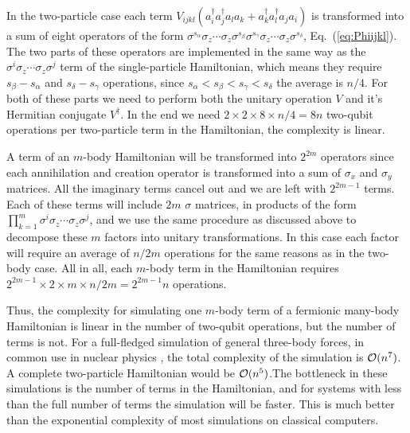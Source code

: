 In the two-particle case each term $V_{ijkl}(a^\dag_i a^\dag_j a_l a_k
+ a^\dag_k a^\dag_l a_j a_i)$ is transformed into a sum of eight
operators of the form $\sigma^{s_\alpha} \sigma_z \cdots \sigma_z
\sigma^{s_\beta} \sigma^{s_\gamma} \sigma_z \cdots \sigma_z
\sigma^{s_\delta}$, Eq.~(\ref{eq:Phiijkl}). The two parts of these
operators are implemented in the same way as the $\sigma^i
\sigma_z\cdots \sigma_z \sigma^j$ term of the single-particle
Hamiltonian, which means they require $s_\beta - s_\alpha$  and
$s_\delta -s_\gamma$ operations, since
$s_\alpha<s_\beta<s_\gamma<s_\delta$  the average is $n/4$. 
For both of these parts we need to perform both the unitary operation
$V$ and it's
Hermitian conjugate $V^\dag$. In the end we need $2\times 2
\times 8 \times n/4=8n$ two-qubit operations per two-particle term in
the Hamiltonian, the complexity is linear.

A term of an $m$-body Hamiltonian will be transformed into $2^{2m}$
operators since each annihilation and creation operator is transformed
into a sum of $\sigma_x$ and $\sigma_y$ matrices. 
All the imaginary terms cancel out and we are left with $2^{2m-1}$
terms. 
Each of these terms
will include $2m$ $\sigma$ matrices, in products of the form
$\prod_{k=1}^m \sigma^i \sigma_z \cdots \sigma_z \sigma^j$,
and we use the same procedure as discussed above 
to decompose these $m$  factors into
unitary 
transformations. In this case each factor will require an average of
$n/2m$ operations for the same reasons as in the two-body case. 
All in all, each $m$-body term in the Hamiltonian requires
$2^{2m-1}\times 2\times m \times n/2m = 2^{2m-1}n$ operations.

Thus, the complexity for simulating one $m$-body term of a fermionic
many-body  Hamiltonian is linear in the number of two-qubit
operations, but the number of terms is  not. For a
full-fledged simulation of general three-body forces, in common use in
nuclear physics \cite{Pieper2001,navratil2002,hagen2007c}, 
the total complexity of the simulation is ${\cal O}
(n^7)$.  A complete two-particle Hamiltonian would be ${\cal O}
(n^5)$.The bottleneck in these simulations is the number of terms in the
Hamiltonian, and for systems with less than the full number of terms
the simulation will be faster.
This is much better than the exponential complexity of
most simulations on classical computers.%




